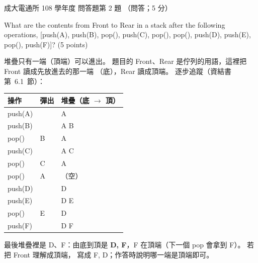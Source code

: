 \begin{pastexam}[label={px:ncku-108-comm-ds-05}]{成大電通所 108 學年度 問答題第 2 題}
（問答；5 分）

What are the contents from Front to Rear in a stack after the following operations, [push(A), push(B),
pop(), push(C), pop(), pop(), push(D), push(E), pop(), push(F)]? (5 points)
\end{pastexam}

\begin{pastsoln}
堆疊只有一端（頂端）可以進出。 題目的 Front、Rear 是佇列的用語，這裡把 Front 讀成先放進去的那一端
（底），Rear 讀成頂端。 逐步追蹤（資結書第~6.1~節）：
\begin{center}
\small
\begin{tabular}{lll}
\toprule
操作 & 彈出 & 堆疊（底 $\to$ 頂） \\
\midrule
push(A) & & A \\
push(B) & & A B \\
pop() & B & A \\
push(C) & & A C \\
pop() & C & A \\
pop() & A & （空） \\
push(D) & & D \\
push(E) & & D E \\
pop() & E & D \\
push(F) & & D F \\
\bottomrule
\end{tabular}
\end{center}
最後堆疊裡是 D、F：由底到頂是 \textbf{D, F}，F 在頂端（下一個 pop 會拿到 F）。 若把 Front 理解成頂端，
寫成 F, D；作答時說明哪一端是頂端即可。
\end{pastsoln}
